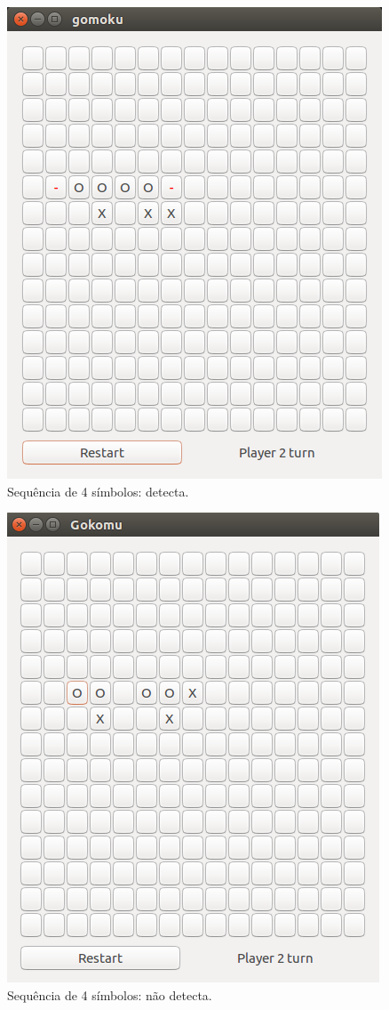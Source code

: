 \documentclass[
	article,			%
	11pt,				%
	oneside,			%
	a4paper,			%
	english,			%
	brazil,				%
	sumario=tradicional
	]{abntex2}
\begin{document}
\begin{figure}[htb]
    \caption{\label{detecta}Sequência de 4 símbolos: detecta.}
        \begin{center}
            \includegraphics[scale=0.6]{detecta.png}
        \end{center}
\end{figure}

\begin{figure}[htb]
    \caption{\label{nao_detecta}Sequência de 4 símbolos: não detecta.}
        \begin{center}
            \includegraphics[scale=0.45]{naodetecta.png}
        \end{center}
\end{figure}
\end{document}
